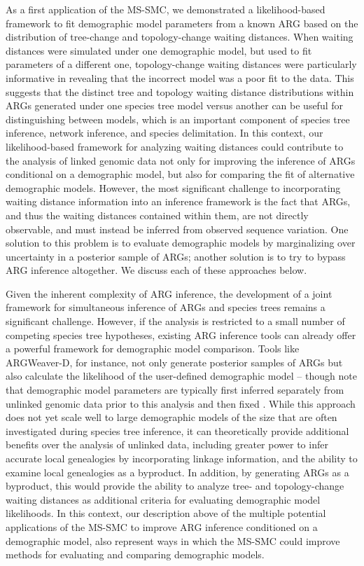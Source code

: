 \documentclass[11pt]{article}
\begin{document}
As a first application of the MS-SMC, we demonstrated a likelihood-based
framework to fit demographic model parameters from a known ARG based on
the distribution of tree-change and topology-change waiting distances. 
% 
When waiting distances were simulated under one demographic model, 
but used to fit parameters of a different one, 
topology-change waiting distances were particularly informative in
revealing that the incorrect model was a poor fit to the data.
% 
This suggests that the distinct tree and topology waiting 
distance distributions within ARGs generated under one species
tree model versus another can be useful for distinguishing 
between models, which is an important component of species
tree inference, network inference, and species delimitation.
% 
In this context, our likelihood-based framework for analyzing 
waiting distances could contribute to the analysis of 
linked genomic data not only for improving the inference of 
ARGs conditional on a demographic model, but also for 
comparing the fit of alternative demographic models.
% 
However, the most significant challenge to incorporating waiting distance
information into an inference framework is the fact that ARGs, and thus 
the waiting distances contained within them, are not directly observable, 
and must instead be inferred from observed sequence variation. 
% 
One solution to this problem is to evaluate demographic models by 
marginalizing over uncertainty in a posterior sample of ARGs; 
another solution is to try to bypass ARG inference altogether.
We discuss each of these approaches below.


Given the inherent complexity of ARG inference, the development 
of a joint framework for simultaneous inference of ARGs and species 
trees remains a significant challenge. 
However, if the analysis is restricted to a small number of 
competing species tree hypotheses, existing ARG inference tools
can already offer a powerful framework for demographic model 
comparison.
% 
Tools like ARGWeaver-D, for instance, not only generate posterior
samples of ARGs but also calculate the likelihood of the 
user-defined demographic model -- though note that demographic model
parameters are typically first inferred separately from unlinked
genomic data prior to this analysis and then fixed
\citep{hubisz2020inference}.
% 
While this approach does not yet scale well to large demographic
models of the size that are often investigated during species
tree inference, it can theoretically provide additional benefits
over the analysis of unlinked data, including greater power to 
infer accurate local genealogies by incorporating linkage information,
and the ability to examine local genealogies as a byproduct.
% 
In addition, by generating ARGs as a byproduct, this would 
provide the ability to analyze tree- and topology-change waiting 
distances as additional criteria for evaluating demographic 
model likelihoods. 
% 
In this context, our description above of the multiple potential
applications of the MS-SMC to improve ARG inference conditioned 
on a demographic model, also represent ways in which the MS-SMC
could improve methods for evaluating and comparing demographic models.
\end{document}
